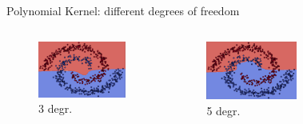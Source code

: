 \documentclass[9.5pt]{beamer}
\begin{document}
    \begin{frame}[fragile]{Polynomial Kernel: different degrees of freedom}
        \begin{columns}[onlytextwidth]
            \scriptsize
            \centering
            \begin{figure}
                \centering
                \includegraphics[width=\linewidth]{images/3}
                \caption{3 degr.}
            \end{figure}
            \centering
            \begin{figure}
                \centering
                \includegraphics[width=\linewidth]{images/5}
                \caption{5 degr.}
            \end{figure}
            \centering
            \begin{figure}
                \centering

\end{figure}
\end{columns}
\end{frame}
\end{document}
